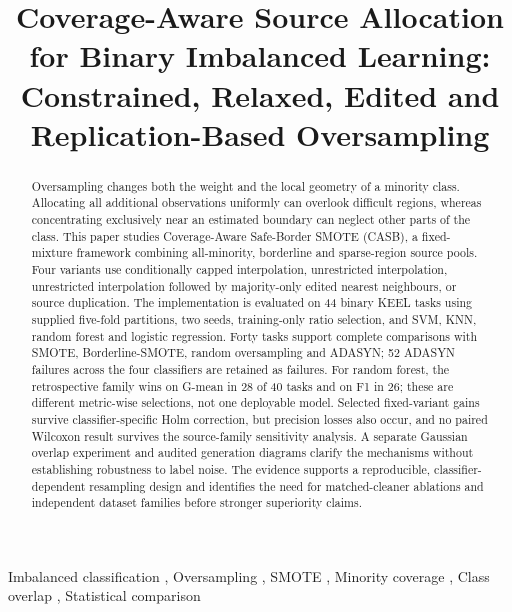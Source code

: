 \documentclass[conference]{IEEEtran}
\begin{document}
\title{Coverage-Aware Source Allocation for Binary Imbalanced Learning: Constrained, Relaxed, Edited and Replication-Based Oversampling}

\author{
}
\maketitle
\begin{abstract}
Oversampling changes both the weight and the local geometry of a minority class. Allocating all additional observations uniformly can overlook difficult regions, whereas concentrating exclusively near an estimated boundary can neglect other parts of the class. This paper studies Coverage-Aware Safe-Border SMOTE (CASB), a fixed-mixture framework combining all-minority, borderline and sparse-region source pools. Four variants use conditionally capped interpolation, unrestricted interpolation, unrestricted interpolation followed by majority-only edited nearest neighbours, or source duplication. The implementation is evaluated on 44 binary KEEL tasks using supplied five-fold partitions, two seeds, training-only ratio selection, and SVM, KNN, random forest and logistic regression. Forty tasks support complete comparisons with SMOTE, Borderline-SMOTE, random oversampling and ADASYN; 52 ADASYN failures across the four classifiers are retained as failures. For random forest, the retrospective family wins on G-mean in 28 of 40 tasks and on F1 in 26; these are different metric-wise selections, not one deployable model. Selected fixed-variant gains survive classifier-specific Holm correction, but precision losses also occur, and no paired Wilcoxon result survives the source-family sensitivity analysis. A separate Gaussian overlap experiment and audited generation diagrams clarify the mechanisms without establishing robustness to label noise. The evidence supports a reproducible, classifier-dependent resampling design and identifies the need for matched-cleaner ablations and independent dataset families before stronger superiority claims.
\end{abstract}
\begin{IEEEkeywords}
Imbalanced classification , Oversampling , SMOTE , Minority coverage , Class overlap , Statistical comparison
\end{IEEEkeywords}
\end{document}
